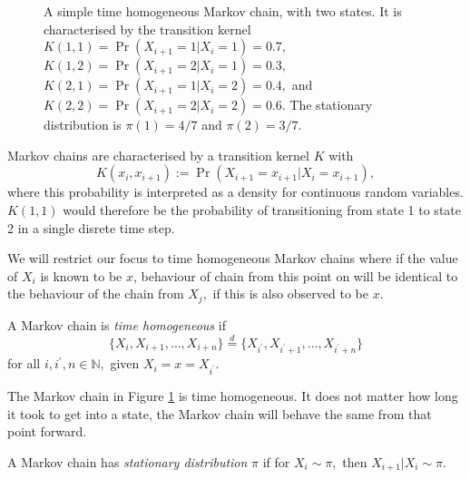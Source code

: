 \begin{figure}[htbp]
    \centering
    \caption{
        A simple time homogeneous Markov chain, with two states.
        It is characterised by the transition kernel
        $K(1, 1) = \Pr(X_{i + 1} = 1 | X_i = 1) = 0.7,$
        $K(1, 2) = \Pr(X_{i + 1} = 2 | X_i = 1) = 0.3,$
        $K(2, 1) = \Pr(X_{i + 1} = 1 | X_i = 2) = 0.4,$ and
        $K(2, 2) = \Pr(X_{i + 1} = 2 | X_i = 2) = 0.6.$ The stationary
        distribution is $\pi(1) = 4/7$ and $\pi(2) = 3/7.$
    }
    \label{fig:MC}
\end{figure}

Markov chains are characterised by a transition kernel $K$ with
$$K(x_i, x_{i + 1}) := \Pr(X_{i + 1} = x_{i + 1} | X_i = x_{i + 1}),$$
where this probability is interpreted as a density for continuous random
variables. $K(1, 1)$ would therefore be the probability of transitioning
from state 1
to state 2 in a single disrete time step.

We will restrict our focus to time homogeneous Markov chains where
if the value of $X_i$ is known to be $x$, behaviour of chain from this point on
will be identical to the behaviour of the chain from $X_j,$ if this is also
observed to be $x$.

\begin{definition}
    A Markov chain is \emph{time homogeneous} if
    $$
        \{X_i, X_{i+1}, \dots, X_{i + n}\}
        \overset{d}{=} \{X_{i^\prime}, X_{i^\prime+1}, \dots, X_{i^\prime + n}\}
    $$
    for all $i, i^\prime, n \in \mathbb{N},$ given $X_i = x = X_{i^\prime}.$
\end{definition}

The Markov chain in Figure \ref{fig:MC} is time homogeneous. It does not
matter how long it took to get into a state, the Markov chain will behave the
same from that point forward.

\begin{definition}
    A Markov chain has \emph{stationary distribution} $\pi$ if for $X_i \sim \pi,$
    then $X_{i + 1} | X_i \sim \pi.$
\end{definition}

